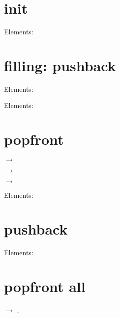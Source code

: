 \documentclass[a4paper]{article}
\newif\ifdequetest
\begin{document}
\section{init}

Elements:

\as{}%

\section{filling: pushback}
%
%
%

Elements:

\as{}%

%
%
%
%
%
%

Elements:

\as{}%

\section{popfront}
\to\front $\rightarrow$ \front\par
{}\to\front $\rightarrow$ \front\par
{}\to\front $\rightarrow$ \front\par


Elements:

\as{}%

\section{pushback}
%
%
%

Elements:

\as{}%

\section{popfront all}
\loop
\pgfplotsdequeifempty{test}{\dequetestfalse}{\dequetesttrue}%
\ifdequetest
	\to\front $\rightarrow$ \front;
\repeat
\end{document}
